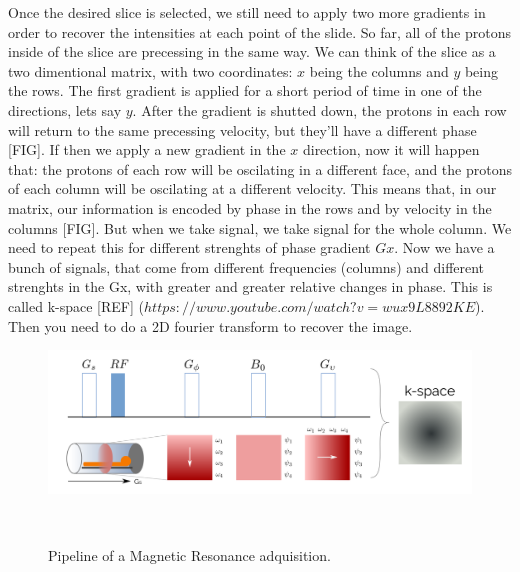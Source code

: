 Once the desired slice is selected, we still need to apply two more gradients in order to recover the intensities at each point of the slide.
So far, all of the protons inside of the slice are precessing in the same way.
We can think of the slice as a two dimentional matrix, with two coordinates: $x$ being the columns and $y$ being the rows.
The first gradient is applied for a short period of time in one of the directions, lets say $y$.
After the gradient is shutted down, the protons in each row will return to the same precessing velocity, but they'll have a different phase [FIG].
If then we apply a new gradient in the $x$ direction, now it will happen that:
the protons of each row will be oscilating in a different face,
and the protons of each column will be oscilating at a different velocity.
This means that, in our matrix, our information is encoded by phase in the rows and by velocity in the columns [FIG].
But when we take signal, we take signal for the whole column.
We need to repeat this for different strenghts of phase gradient $Gx$.
Now we have a bunch of signals, that come from different frequencies (columns) and different strenghts in the Gx, with greater and greater relative changes in phase.
This is called k-space [REF] ($https://www.youtube.com/watch?v=wux9L8892KE$).
Then you need to do a 2D fourier transform to recover the image.

\begin{figure}[h!]
                                                                                                                        
\begin{minipage}[b]{\textwidth}
    \includegraphics[width=\textwidth]{2.background/mri/img/kspace.png}
    \caption{Pipeline of a Magnetic Resonance adquisition.}
    \label{fig:kspace}
\end{minipage} ~

\end{figure}


